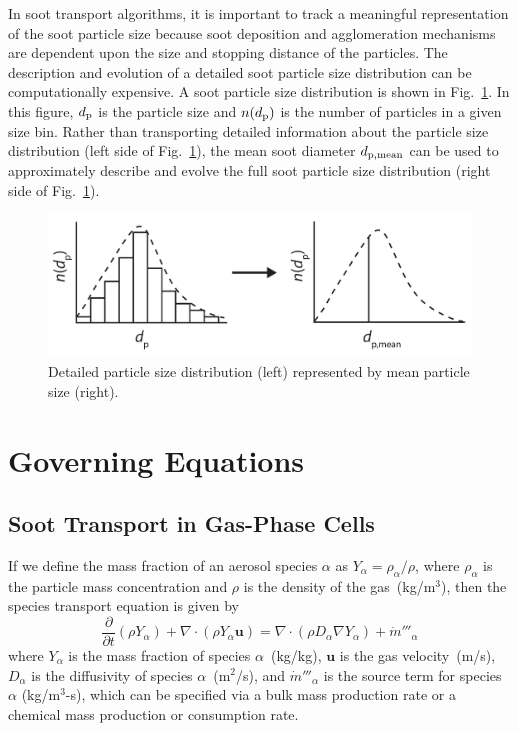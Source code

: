 In soot transport algorithms, it is important to track a meaningful representation of the soot particle size because soot deposition and agglomeration mechanisms are dependent upon the size and stopping distance of the particles. The description and evolution of a detailed soot particle size distribution can be computationally expensive. A soot particle size distribution is shown in Fig.~\ref{fig:particle_size_distribution}. In this figure, $d\sb{p}$ is the particle size and $n(d\sb{p})$ is the number of particles in a given size bin. Rather than transporting detailed information about the particle size distribution (left side of Fig.~\ref{fig:particle_size_distribution}), the mean soot diameter $d\sb{p, mean}$ can be used to approximately describe and evolve the full soot particle size distribution (right side of Fig.~\ref{fig:particle_size_distribution}).

\begin{figure}[!ht]
\centering
\includegraphics[width=5.0in]{Fig_Particle_Size_Distribution.pdf}
\caption[Detailed soot particle size distribution and mean particle size]
{Detailed particle size distribution (left) represented by mean particle size (right).}
\label{fig:particle_size_distribution}
\end{figure}

\section{Governing Equations}
\label{sec:Governing Equations}


\subsection{Soot Transport in Gas-Phase Cells}

If we define the mass fraction of an aerosol species $\alpha$ as $Y_\alpha = \rho_\alpha/\rho$, where $\rho_\alpha$ is the particle mass concentration and $\rho$ is the density of the gas~(kg/m$^3$), then the species transport equation is given by~\cite{FDS_Math_Guide}
\begin{equation}
\frac{\partial}{\partial t} (\rho Y_\alpha) + \nabla \cdot (\rho Y_\alpha \mathbf{u}) = \nabla \cdot (\rho D_\alpha \nabla Y_\alpha) + \dot m'''_\alpha
\label{eq:species_transport}
\end{equation}
where $Y_\alpha$ is the mass fraction of species $\alpha$~(kg/kg), $\mathbf{u}$ is the gas velocity~(m/s), $D_\alpha$ is the diffusivity of species $\alpha$~(m$^2$/s), and $\dot m'''_\alpha$ is the source term for species $\alpha$ (kg/m$^3$-s), which can be specified via a bulk mass production rate or a chemical mass production or consumption rate.

